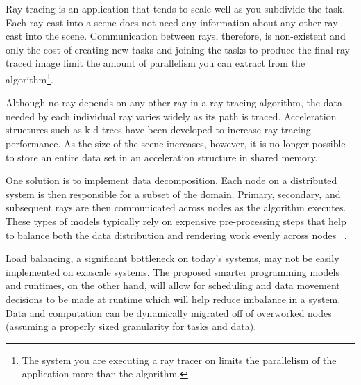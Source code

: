 Ray tracing is an application that tends to scale well as you subdivide the 
task.  Each ray cast into a scene does not need any information about any other 
ray cast into the scene.  Communication between rays, therefore, is non-existent 
and only the cost of creating new tasks and joining the tasks to produce the 
final ray traced image limit the amount of parallelism you can extract from the
algorithm\footnote{ %
  The system you are executing a ray tracer on limits the parallelism of the 
  application more than the algorithm.  
}.

Although no ray depends on any other ray in a ray tracing algorithm, the data 
needed by each individual ray varies widely as its path is traced. Acceleration 
structures such as k-d trees have been developed to increase ray tracing 
performance. As the size of the scene increases, however, it is no longer 
possible to store an entire data set in an acceleration structure in shared 
memory.

One solution is to implement data decomposition. Each node on a distributed 
system is then responsible for a subset of the domain. Primary, secondary, 
and subsequent rays are then communicated across nodes as the algorithm 
executes. These types of models typically rely on expensive pre-processing steps 
that help to balance both the data distribution and rendering work evenly across 
nodes ~\cite{navratil2014dynamic}.

Load balancing, a significant bottleneck on today's systems, may not be easily 
implemented on exascale systems. The proposed smarter programming models and 
runtimes, on the other hand, will allow for scheduling and data movement 
decisions to be made at runtime which will help reduce imbalance in a system. 
Data and computation can be dynamically migrated off of overworked nodes 
(assuming a properly sized granularity for tasks and data).

